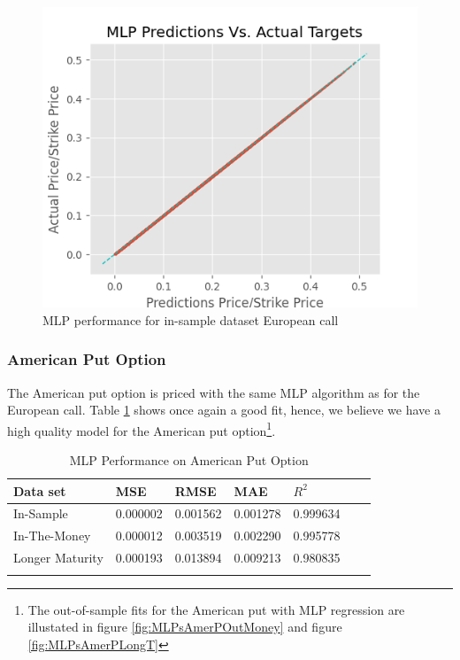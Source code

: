 \begin{figure}[th]
\centering
\includegraphics{Figures/PredictionEuroC.png}
\decoRule
\caption[MLP Performance for In-sample Dataset European Call]{MLP performance for in-sample dataset European call}
\label{fig:MLPInSampleEuroC}
\end{figure}


\subsubsection{American Put Option}
The American put option is priced with the same MLP algorithm as for the European call. Table \ref{tab:AmerPerformanceComparision} shows once again a good fit, hence, we believe we have a high quality model for the American put option\footnote{The out-of-sample fits for the American put with MLP regression are illustated in figure \ref{fig:MLPsAmerPOutMoney} and figure \ref{fig:MLPsAmerPLongT}}.

\begin{table}[th]
\caption{MLP Performance on American Put Option}
\label{tab:AmerPerformanceComparision}
\centering
\begin{tabular}{l l l l l l l }
\toprule
\textbf{Data set} & \textbf{MSE} & \textbf{RMSE} & \textbf{MAE} & \textbf{$R^2$} \\
\midrule
In-Sample & 0.000002 & 0.001562 & 0.001278 & 0.999634\\
In-The-Money & 0.000012 & 0.003519 & 0.002290 & 0.995778\\
Longer Maturity & 0.000193 & 0.013894 & 0.009213 & 0.980835\\
\bottomrule\\
\end{tabular}
\end{table}

